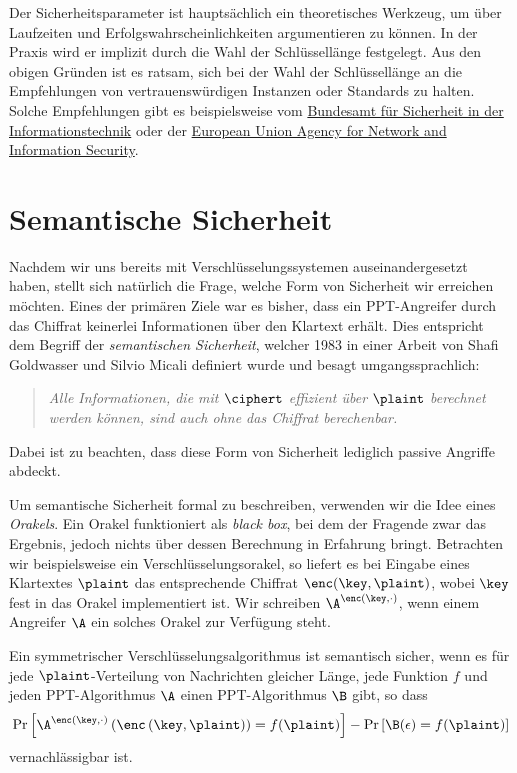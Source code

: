 Der Sicherheitsparameter ist hauptsächlich ein theoretisches Werkzeug, um über Laufzeiten und Erfolgswahrscheinlichkeiten argumentieren zu können. In der Praxis wird er implizit durch die Wahl der Schlüssellänge festgelegt. Aus den obigen Gründen ist es ratsam, sich bei der Wahl der Schlüssellänge an die Empfehlungen von vertrauenswürdigen Instanzen oder Standards zu halten. Solche Empfehlungen gibt es beispielsweise vom \href{https://www.bsi.bund.de/DE/Publikationen/TechnischeRichtlinien/tr02102/index_htm.html}{Bundesamt für Sicherheit in der Informationstechnik} oder der \href{https://www.enisa.europa.eu/activities/identity-and-trust/library/deliverables/algorithms-key-size-and-parameters-report-2014}{European Union Agency for Network and Information Security}.

\section{Semantische Sicherheit}\label{ch:sicherheitsbegriffe:semantischesicherheit}
Nachdem wir uns bereits mit Verschlüsselungssystemen auseinandergesetzt haben, stellt sich natürlich die Frage, welche Form von Sicherheit wir erreichen möchten. 
Eines der primären Ziele war es bisher, dass ein PPT-Angreifer durch das Chiffrat keinerlei Informationen über den Klartext erhält. Dies entspricht dem Begriff der \emph{semantischen Sicherheit},
welcher 1983 in einer Arbeit von Shafi Goldwasser und Silvio Micali \cite{Goldwasser1984} definiert wurde und besagt umgangssprachlich:
\begin{quote}
	\emph{Alle Informationen, die mit $\ciphert$ effizient über $\plaint$ berechnet werden können, sind auch ohne das Chiffrat berechenbar.}
\end{quote}
Dabei ist zu beachten, dass diese Form von Sicherheit lediglich passive Angriffe abdeckt.

Um semantische Sicherheit formal zu beschreiben, verwenden wir die Idee
eines \emph{Orakels}. Ein Orakel funktioniert als \emph{black box}, bei
dem der Fragende zwar das Ergebnis, jedoch nichts über dessen Berechnung
in Erfahrung bringt. Betrachten wir beispielsweise ein
Verschlüsselungsorakel, so liefert es bei Eingabe eines Klartextes
$\plaint$ das entsprechende Chiffrat $\enc(\key, \plaint)$, wobei $\key$
fest in das Orakel implementiert ist. Wir schreiben $\A^{\enc (\key,
  \cdot)}$, wenn einem Angreifer $\A$ ein solches Orakel zur Verfügung steht.

\begin{definition}\label{def:semsec}
Ein symmetrischer Verschlüsselungsalgorithmus ist semantisch sicher, wenn es für jede $\plaint$-Verteilung von Nachrichten gleicher Länge, jede Funktion $f$ und jeden PPT-Algorithmus $\A$ einen PPT-Algorithmus $\B$ gibt, so dass
\begin{align*}
	\text{Pr}\left[ \A^{\enc (\key,\cdot)} \left( \enc \left( \key, \plaint \right) \right) = f(\plaint) \right] - \text{Pr} \left[ \B (\epsilon) = f (\plaint) \right]
\end{align*}
vernachlässigbar ist.
\end{definition}

